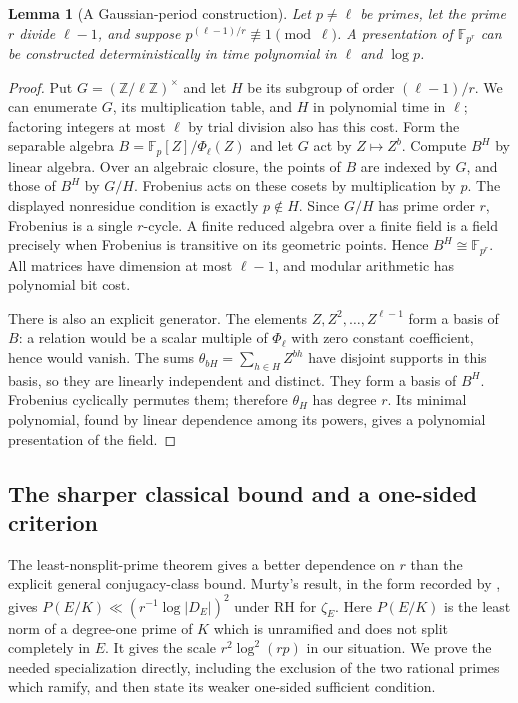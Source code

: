 \documentclass[11pt]{article}
\newcommand{\F}{\mathbb F}
\newcommand{\Z}{\mathbb Z}
\newtheorem{lemma}[theorem]{Lemma}
\theoremstyle{definition}
\theoremstyle{remark}
\begin{document}
\begin{lemma}[A Gaussian-period construction]\label{lem:period}
Let $p\ne\ell$ be primes, let the prime $r$ divide $\ell-1$, and
suppose $p^{(\ell-1)/r}\not\equiv1\pmod\ell$.
A presentation of $\F_{p^r}$ can be constructed deterministically
in time polynomial in $\ell$ and $\log p$.
\end{lemma}
\begin{proof}
Put $G=(\Z/\ell\Z)^\times$ and let $H$ be its subgroup of
order $(\ell-1)/r$.  We can enumerate $G$, its multiplication
table, and $H$ in polynomial time in $\ell$; factoring integers
at most $\ell$ by trial division also has this cost.  Form the
separable algebra $B=\F_p[Z]/\Phi_\ell(Z)$ and let $G$ act by
$Z\mapsto Z^b$.  Compute $B^H$ by linear algebra.
Over an algebraic closure, the points of $B$ are indexed by
$G$, and those of $B^H$ by $G/H$.  Frobenius acts on these
cosets by multiplication by $p$.  The displayed nonresidue
condition is exactly $p\notin H$.  Since $G/H$ has prime order
$r$, Frobenius is a single $r$-cycle.  A finite reduced algebra
over a finite field is a field precisely when Frobenius is
transitive on its geometric points.  Hence $B^H\cong\F_{p^r}$.
All matrices have dimension at most $\ell-1$, and modular
arithmetic has polynomial bit cost.

There is also an explicit generator.  The elements
$Z,Z^2,\ldots,Z^{\ell-1}$ form a basis of $B$: a relation
would be a scalar multiple of $\Phi_\ell$ with zero constant
coefficient, hence would vanish.  The sums
$\theta_{bH}=\sum_{h\in H}Z^{bh}$ have disjoint supports in
this basis, so they are linearly independent and distinct.
They form a basis of $B^H$.  Frobenius cyclically permutes them;
therefore $\theta_H$ has degree $r$.  Its minimal polynomial,
found by linear dependence among its powers, gives a polynomial
presentation of the field.
\end{proof}

\subsection{The sharper classical bound and a one-sided criterion}
The least-nonsplit-prime theorem gives a better dependence on $r$ than
the explicit general conjugacy-class bound.  Murty's result, in the
form recorded by \citet[p.~1, equation~(1.2)]{Zaman2018}, gives
$P(E/K)\ll(r^{-1}\log|D_E|)^2$ under RH for $\zeta_E$.
Here $P(E/K)$ is the least norm of a degree-one prime of $K$
which is unramified and does not split completely in $E$.
It gives the scale $r^2\log^2(rp)$ in our situation.
We prove the needed specialization directly, including the exclusion
of the two rational primes which ramify, and then state its weaker
one-sided sufficient condition.
\end{document}
